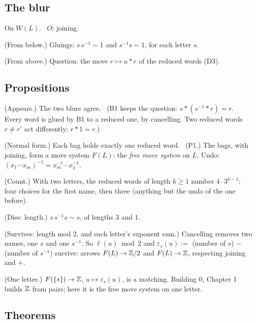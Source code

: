 \subsection*{The blur}

On $W(L)$. \ $O$: joining.

\begin{lines}
\item[\lab{B1}] (From below.) Gluings: $s\, s^{-1} \sim 1$ and $s^{-1} s \sim 1$, for each letter $s$.
\item[\lab{B2}] (From above.) Question: the move $r \mapsto u \ast r$ of the reduced words (D3).
\end{lines}

\subsection*{Propositions}

\begin{lines}
\item[\lab{P1}] (Appears.) The two blurs agree. \ (B1 keeps the question: $s \ast (s^{-1} \ast r) = r$. Every word is glued by B1 to a reduced one, by cancelling. Two reduced words $r \ne r'$ act differently: $r \ast 1 = r$.)
\item[\lab{P2}] (Normal form.) Each bag holds exactly one reduced word. \ (P1.) The bags, with joining, form a move system $F(L)$: the \emph{free move system} on $L$. Undo: $(x_1 \cdots x_m)^{-1} = x_m^{-1} \cdots x_1^{-1}$.
\item[\lab{P3}] (Count.) With two letters, the reduced words of length $k \ge 1$ number $4 \cdot 3^{k-1}$: four choices for the first name, then three (anything but the undo of the one before).
\item[\lab{P4}] (Dies: length.) $s\, s^{-1} s \sim s$, of lengths $3$ and $1$.
\item[\lab{P5}] (Survives: length mod $2$, and each letter's exponent sum.) Cancelling removes two names, one $s$ and one $s^{-1}$. So $\ell(u) \bmod 2$ and $\varepsilon_s(u) := $ (number of $s$) $-$ (number of $s^{-1}$) survive: arrows $F(L) \to \mathbb{Z}/2$ and $F(L) \to \mathbb{Z}$, respecting joining and $+$.
\item[\lab{P6}] (One letter.) $F(\{s\}) \to \mathbb{Z}$, $u \mapsto \varepsilon_s(u)$, is a matching. Building 0, Chapter 1 builds $\mathbb{Z}$ from pairs; here it is the free move system on one letter.
\end{lines}

\subsection*{Theorems}


